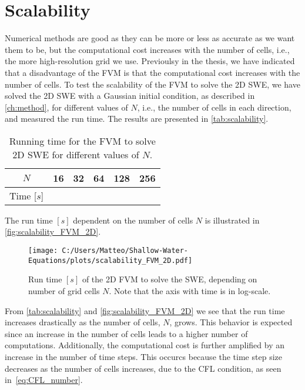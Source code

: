 \section{Scalability}\label{sec:scalability}
Numerical methods are good as they can be more or less as accurate as we want them to be, but the computational cost increases with the number of cells, i.e., the more high-resolution grid we use.
Previoulsy in the thesis, we have indicated that a disadvantage of the FVM is that the computational cost increases with the number of cells.
To test the scalability of the FVM to solve the 2D SWE, we have solved the 2D SWE with a Gaussian initial condition, as described in \autoref{ch:method}, for different values of $N$, i.e., the number of cells in each direction, and measured the run time.
The results are presented in \autoref{tab:scalability}.
\begin{table}[H]
    \centering
    \begin{tabular}{c|ccccc}
        \hline
        $N$ & 16 & 32 & 64 & 128 & 256 \\
        \hline 
        Time [$s$] & 
         &
         &
         &
         &
        
        \\
        \hline
    \end{tabular}
    \caption{Running time for the FVM to solve 2D SWE for different values of $N$.}\label{tab:scalability}
\end{table}
The run time $[s]$ dependent on the number of cells $N$ is illustrated in \autoref{fig:scalability_FVM_2D}.
\begin{figure}[H]
    \centering
    \texttt{[image: C:/Users/Matteo/Shallow-Water-Equations/plots/scalability\_FVM\_2D.pdf]}
    \caption{Run time $[s]$ of the 2D FVM to solve the SWE, depending on number of grid cells $N$.
            Note that the axis with time is in log-scale.}\label{fig:scalability_FVM_2D}
\end{figure}
From \autoref{tab:scalability} and \autoref{fig:scalability_FVM_2D} we see that the run time increases drastically as the number of cells, $N$, grows.
This behavior is expected since an increase in the number of cells leads to a higher number of computations.
Additionally, the computational cost is further amplified by an increase in the number of time steps.
This occurcs because the time step size decreases as the number of cells increases, due to the CFL condition, as seen in~\eqref{eq:CFL_number}.

